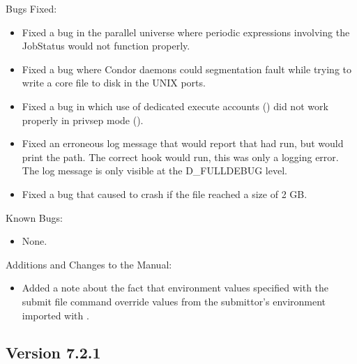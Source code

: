 \noindent Bugs Fixed:

\begin{itemize}

\item Fixed a bug in the parallel universe where periodic expressions
involving the JobStatus would not function properly.

\item Fixed a bug where Condor daemons could segmentation fault while trying
to write a core file to disk in the UNIX ports.

\item Fixed a bug in which use of dedicated execute accounts
() did not work properly
in privsep mode ().

\item Fixed an erroneous log message that would report that  had run, but would print the  path.  The correct hook would run, this was only a logging error.  The log message is only visible at the D\_FULLDEBUG level.

\item Fixed a bug that caused  to crash if the
 file reached a size of 2 GB.

\end{itemize}

\noindent Known Bugs:

\begin{itemize}

\item None.

\end{itemize}

\noindent Additions and Changes to the Manual:

\begin{itemize}

\item Added a note about the fact that environment values specified
with the  submit file command override values from
the submittor's environment imported with .

\end{itemize}


\subsection*{\label{sec:New-7-2-1}Version 7.2.1}

